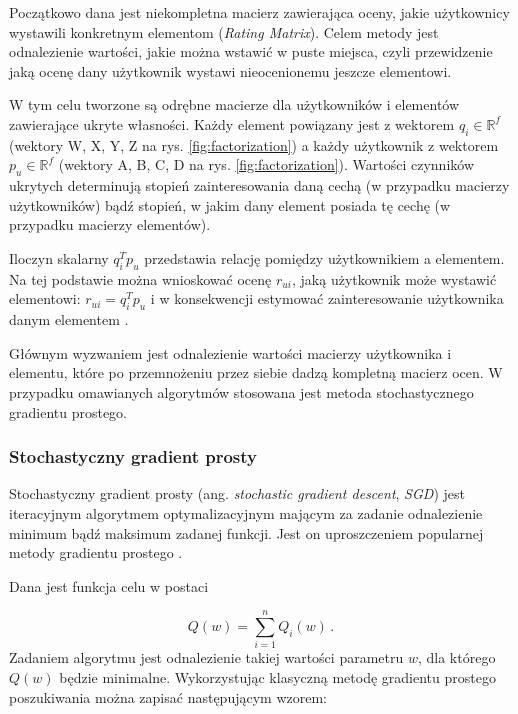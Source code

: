 \documentclass[twoside]{iisthesis}
\begin{document}
	 Początkowo dana jest niekompletna macierz zawierająca oceny, jakie użytkownicy wystawili konkretnym elementom (\textit{Rating Matrix}). Celem metody jest odnalezienie wartości, jakie można wstawić w puste miejsca, czyli przewidzenie jaką ocenę dany użytkownik wystawi nieocenionemu jeszcze elementowi. 		
	 
	 W tym celu tworzone są odrębne macierze dla użytkowników i elementów zawierające ukryte własności. Każdy element powiązany jest z wektorem $q_i \in \mathbb{R} ^f$ (wektory W, X, Y, Z na rys. \ref{fig:factorization}) a każdy użytkownik z wektorem $p_u \in \mathbb{R} ^f$ (wektory A, B, C, D na rys. \ref{fig:factorization}). Wartości czynników ukrytych determinują stopień zainteresowania daną cechą (w przypadku macierzy użytkowników) bądź stopień, w jakim dany element posiada tę cechę (w przypadku macierzy elementów).		
	 
	 Iloczyn skalarny $q_i^T p_u$ przedstawia relację pomiędzy użytkownikiem a elementem. Na tej podstawie można wnioskować ocenę $r_{ui}$, jaką użytkownik może wystawić elementowi: $r_{ui} = q_i^T p_u$ i w konsekwencji estymować zainteresowanie użytkownika danym elementem \cite{koren2009matrix}.
	 
	 Głównym wyzwaniem jest odnalezienie wartości macierzy użytkownika i elementu, które po przemnożeniu przez siebie dadzą kompletną macierz ocen. W przypadku omawianych algorytmów stosowana jest metoda stochastycznego gradientu prostego. 
	 
	 \subsubsection{Stochastyczny gradient prosty}
	 
	 Stochastyczny gradient prosty (ang. \textit{stochastic gradient descent}, \textit{SGD}) jest iteracyjnym algorytmem optymalizacyjnym mającym za zadanie odnalezienie minimum bądź maksimum zadanej funkcji. Jest on uproszczeniem popularnej metody gradientu prostego \cite{bottou2012stochastic}.
	 
	 Dana jest funkcja celu w postaci
	 
	 \begin{equation}
	 \label{eq:sgd1}
	 Q(w) = \sum_{i=1}^{n}Q_i(w)
	 \,.
	 \end{equation}			
	 Zadaniem algorytmu jest odnalezienie takiej wartości parametru $w$, dla którego $Q(w)$ będzie minimalne. Wykorzystując klasyczną metodę gradientu prostego poszukiwania można zapisać następującym wzorem:
	 
\end{document}
